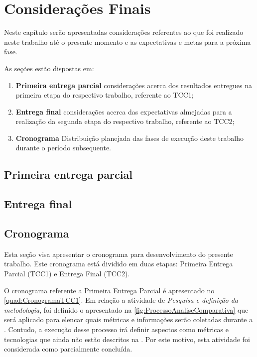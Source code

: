 \chapter{Considerações Finais}

Neste capítulo serão apresentadas considerações referentes ao que foi realizado
neste trabalho até o presente momento e as expectativas e metas para a próxima
fase.

  As seções estão dispostas em:

  \begin{enumerate}
    \item \textbf{Primeira entrega parcial} considerações acerca dos resultados
    entregues na primeira etapa do respectivo trabalho, referente ao \gls{TCC1};
    \item \textbf{Entrega final} considerações acerca das expectativas almejadas
    para a realização da segunda etapa do respectivo trabalho, referente ao \gls{TCC2};
    \item \textbf{Cronograma} Distribuição planejada das fases de execução deste
    trabalho durante o período subsequente.
  \end{enumerate}

\section{Primeira entrega parcial}
\section{Entrega final}
\section{Cronograma}

Esta seção visa apresentar o cronograma para desenvolvimento do presente trabalho. Este
cronograma está dividido em duas etapas: Primeira Entrega Parcial (\gls{TCC1}) e Entrega Final
(\gls{TCC2}).

O cronograma referente a Primeira Entrega Parcial é apresentado no \autoref{quad:CronogramaTCC1}.
Em relação a atividade de \textit{Pesquisa e definição da metodologia}, foi definido o
 apresentado na \autoref{fig:ProcessoAnaliseComparativa}
que será aplicado para elencar quais métricas e informações serão coletadas durante a
.  Contudo, a execução desse processo irá definir aspectos como métricas
e tecnologias que ainda não estão descritos na . Por este motivo,
esta atividade foi considerada como parcialmente concluída.

